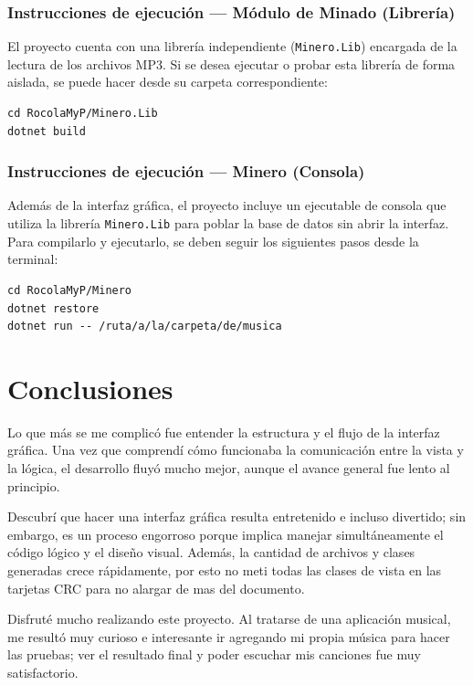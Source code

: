 \documentclass{article}
\begin{document}
\subsubsection{Instrucciones de ejecución — Módulo de Minado (Librería)}
El proyecto cuenta con una librería independiente (\texttt{Minero.Lib}) encargada de la lectura de los archivos MP3. Si se desea ejecutar o probar esta librería de forma aislada, se puede hacer desde su carpeta correspondiente:

\begin{verbatim}
cd RocolaMyP/Minero.Lib
dotnet build
\end{verbatim}

\subsubsection{Instrucciones de ejecución — Minero (Consola)}
Además de la interfaz gráfica, el proyecto incluye un ejecutable de consola que utiliza la librería \texttt{Minero.Lib} para poblar la base de datos sin abrir la interfaz. Para compilarlo y ejecutarlo, se deben seguir los siguientes pasos desde la terminal:

\begin{verbatim}
cd RocolaMyP/Minero
dotnet restore
dotnet run -- /ruta/a/la/carpeta/de/musica
\end{verbatim}

\section{Conclusiones}
\label{sec:conclusiones}

Lo que más se me complicó fue entender la estructura y el flujo de la interfaz gráfica. Una vez que comprendí cómo funcionaba la comunicación entre la vista y la lógica, el desarrollo fluyó mucho mejor, aunque el avance general fue lento al principio. 

Descubrí que hacer una interfaz gráfica resulta entretenido e incluso divertido; sin embargo, es un proceso engorroso porque implica manejar simultáneamente el código lógico y el diseño visual. Además, la cantidad de archivos y clases generadas crece rápidamente, por esto no meti todas las clases de vista en las tarjetas CRC para no alargar de mas del documento.

Disfruté mucho realizando este proyecto. Al tratarse de una aplicación musical, me resultó muy curioso e interesante ir agregando mi propia música para hacer las pruebas; ver el resultado final y poder escuchar mis canciones fue muy satisfactorio.
\end{document}
